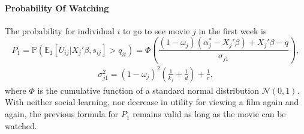 \documentclass{article}
\begin{document}
\paragraph{Probability Of Watching}
The probability for individual $i$ to go to see movie $j$ in the first week is
\begin{equation} \label{eq:4}
P_{1}=\mathbb{P}(\mathbb{E}_1[U_{i j}|X_{j}'\beta, s_{i j}]>q_{i t})=\Phi\left(\frac{(1-\omega_{j})(\alpha_{j}^{*}-X_{j}'\beta)+X_{j}'\beta-q}{\sigma_{j 1}}\right),
\end{equation}
\begin{align*}
\sigma_{j 1}^{2}=(1-\omega_{j})^{2}\left(\frac{1}{k_{j}}+\frac{1}{d}\right)+\frac{1}{r},
\end{align*}
where $\Phi$ is the cumulative function of a standard normal distribution $\mathcal{N}(0,1)$.
With neither social learning, nor decrease in utility for viewing a film again and again, the previous formula for $P_{1}$ remains valid as long as the movie can be watched.\\
\end{document}
